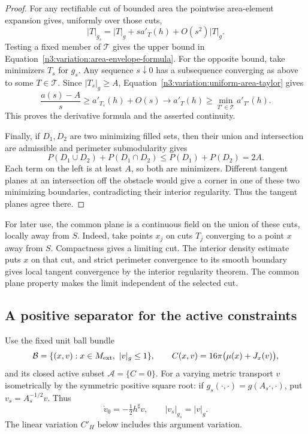 \begin{proof}
For any rectifiable cut of bounded area the pointwise area-element
expansion gives, uniformly over those cuts,
\begin{equation}
 |T|_{g_s}=|T|_g+s a'_T(h)+O(s^2)|T|_g.
 \label{n3:variation:uniform-area-taylor}
\end{equation}
Testing a fixed member of $\mathcal T$ gives the upper bound in
Equation~\eqref{n3:variation:area-envelope-formula}.  For the opposite
bound, take minimizers $T_s$ for $g_s$.  Any sequence $s\downarrow0$
has a subsequence converging as above to some $T\in\mathcal T$.
Since $|T_s|_g\ge A$, Equation~\eqref{n3:variation:uniform-area-taylor}
gives
\[
 \frac{a(s)-A}{s}\ge a'_{T_s}(h)+O(s)
       \longrightarrow a'_T(h)
       \ge\min_{T'\in\mathcal T}a'_{T'}(h).
\]
This proves the derivative formula and the asserted continuity.

Finally, if $D_1,D_2$ are two minimizing filled sets, then their union
and intersection are admissible and perimeter submodularity gives
\[
 P(D_1\cup D_2)+P(D_1\cap D_2)
       \le P(D_1)+P(D_2)=2A.
\]
Each term on the left is at least $A$, so both are minimizers.
Different tangent planes at an intersection off the obstacle would
give a corner in one of these two minimizing boundaries, contradicting
their interior regularity.  Thus the tangent planes agree there.
\end{proof}

For later use, the common plane is a continuous field on the union
of these cuts, locally away from $S$.  Indeed, take points $x_j$ on
cuts $T_j$ converging to a point $x$ away from $S$.  Compactness gives
a limiting cut.  The interior density estimate puts $x$ on that cut,
and strict perimeter convergence to its smooth boundary gives local
tangent convergence by the interior regularity theorem.  The common
plane property makes the limit independent of the selected cut.

\subsection{A positive separator for the active constraints}
\label{n3:variation:separation-subsection}

Use the fixed unit ball bundle
\[
 \mathcal B=\{(x,v):x\in M_{\mathrm{ext}},\ |v|_g\le1\},\qquad
 C(x,v)=16\pi\bigl(\mu(x)+J_x(v)\bigr),
\]
and its closed active subset $\mathcal A=\{C=0\}$.
For a varying metric transport $v$ isometrically by the symmetric
positive square root: if $g_s(\cdot,\cdot)=g(A_s\cdot,\cdot)$,
put $v_s=A_s^{-1/2}v$.  Thus
\begin{equation}
 \dot v_0=-\tfrac12 h^\sharp v,
 \qquad |v_s|_{g_s}=|v|_g.
 \label{n3:variation:frame-derivative}
\end{equation}
The linear variation $C'_H$ below includes this argument variation.

